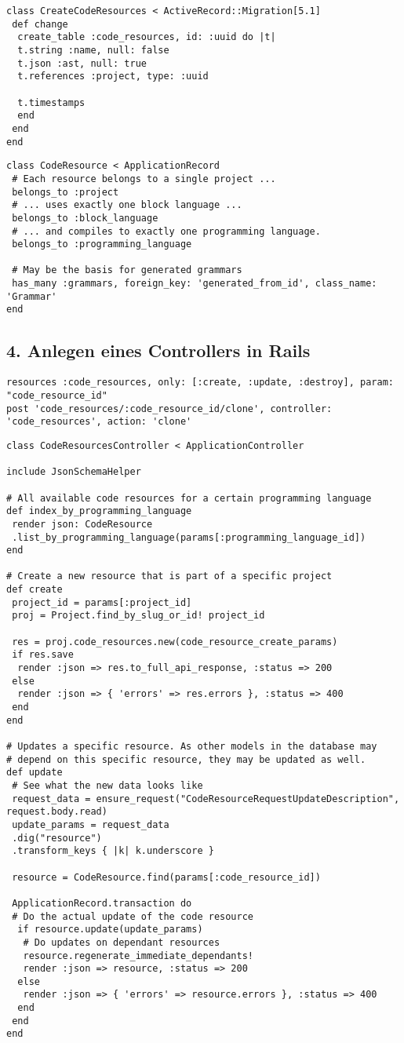\begin{lstlisting}
class CreateCodeResources < ActiveRecord::Migration[5.1]
 def change
  create_table :code_resources, id: :uuid do |t|
  t.string :name, null: false
  t.json :ast, null: true
  t.references :project, type: :uuid

  t.timestamps
  end
 end
end
\end{lstlisting}

\begin{lstlisting}
class CodeResource < ApplicationRecord
 # Each resource belongs to a single project ...
 belongs_to :project
 # ... uses exactly one block language ...
 belongs_to :block_language
 # ... and compiles to exactly one programming language.
 belongs_to :programming_language

 # May be the basis for generated grammars
 has_many :grammars, foreign_key: 'generated_from_id', class_name: 'Grammar'
end
\end{lstlisting}
\subsection{4. Anlegen eines Controllers in Rails}
\begin{lstlisting}
resources :code_resources, only: [:create, :update, :destroy], param: "code_resource_id"
post 'code_resources/:code_resource_id/clone', controller:  'code_resources', action: 'clone'
\end{lstlisting}
\begin{lstlisting}
class CodeResourcesController < ApplicationController

include JsonSchemaHelper

# All available code resources for a certain programming language
def index_by_programming_language
 render json: CodeResource
 .list_by_programming_language(params[:programming_language_id])
end

# Create a new resource that is part of a specific project
def create
 project_id = params[:project_id]
 proj = Project.find_by_slug_or_id! project_id

 res = proj.code_resources.new(code_resource_create_params)
 if res.save
  render :json => res.to_full_api_response, :status => 200
 else
  render :json => { 'errors' => res.errors }, :status => 400
 end
end

# Updates a specific resource. As other models in the database may
# depend on this specific resource, they may be updated as well.
def update
 # See what the new data looks like
 request_data = ensure_request("CodeResourceRequestUpdateDescription", request.body.read)
 update_params = request_data
 .dig("resource")
 .transform_keys { |k| k.underscore }

 resource = CodeResource.find(params[:code_resource_id])

 ApplicationRecord.transaction do
 # Do the actual update of the code resource
  if resource.update(update_params)
   # Do updates on dependant resources
   resource.regenerate_immediate_dependants!
   render :json => resource, :status => 200
  else
   render :json => { 'errors' => resource.errors }, :status => 400
  end
 end
end
 \end{lstlisting}
